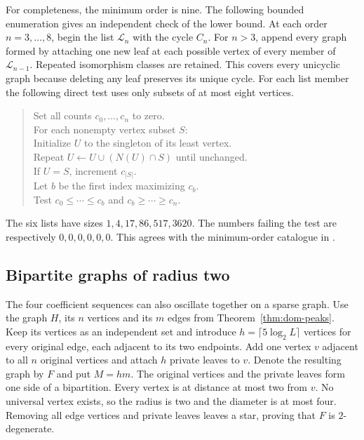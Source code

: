\documentclass[11pt,a4paper]{article}
\begin{document}
For completeness, the minimum order is nine. The following bounded
enumeration gives an independent check of the lower bound. At each
order $n=3,\ldots,8$, begin the list $\mathcal L_n$ with the cycle
$C_n$. For $n>3$, append every graph formed by attaching one new leaf
at each possible vertex of every member of $\mathcal L_{n-1}$.
Repeated isomorphism classes are retained. This covers every
unicyclic graph because deleting any leaf preserves its unique cycle.
For each list member the following direct test uses only subsets of
at most eight vertices.
\begin{quote}\ttfamily\small
Set all counts $c_0,\ldots,c_n$ to zero.\\
For each nonempty vertex subset $S$:\\
\hspace*{1em} Initialize $U$ to the singleton of its least vertex.\\
\hspace*{1em} Repeat $U\gets U\cup(N(U)\cap S)$ until unchanged.\\
\hspace*{1em} If $U=S$, increment $c_{|S|}$.\\
Let $b$ be the first index maximizing $c_b$.\\
Test $c_0\le\cdots\le c_b$ and $c_b\ge\cdots\ge c_n$.
\end{quote}
The six lists have sizes $1,4,17,86,517,3620$. The numbers failing
the test are respectively $0,0,0,0,0,0$. This agrees with the
minimum-order catalogue in \cite{carptopusconnected}.

\subsection{Bipartite graphs of radius two}
\label{sec:bipartite-peaks}

The four coefficient sequences can also oscillate together on a sparse
graph. Use the graph $H$, its $n$ vertices and its $m$ edges from
Theorem~\ref{thm:dom-peaks}. Keep its vertices as an independent set
and introduce $h=\lceil5\log_2 L\rceil$ vertices for every original
edge, each adjacent to its two endpoints. Add one vertex $v$ adjacent
to all $n$ original vertices and attach $h$ private leaves to $v$.
Denote the resulting graph by $F$ and put $M=hm$. The original vertices
and the private leaves form one side of a bipartition. Every vertex is
at distance at most two from $v$. No universal vertex exists, so the
radius is two and the diameter is at most four. Removing all edge
vertices and private leaves leaves a star, proving that $F$ is
$2$-degenerate.
\end{document}
